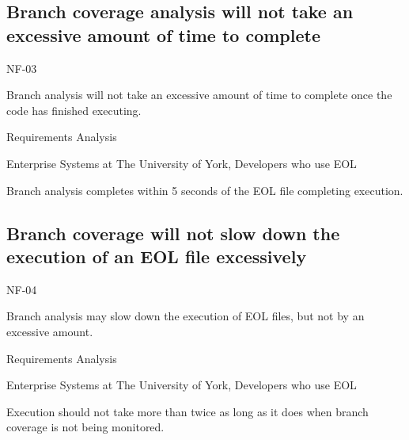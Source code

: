 \subsection{Branch coverage analysis will not take an excessive amount of time to complete}
\begin{description}[style=sameline,leftmargin=4.5cm,nolistsep]
\item[\hspace*{0.3cm}Label] NF-03
\item[\hspace*{0.3cm}Description] Branch analysis will not take an excessive amount of time to complete once the code has finished executing.
\item[\hspace*{0.3cm}Source] Requirements Analysis
\item[\hspace*{0.3cm}Stakeholders] Enterprise Systems at The University of York, Developers who use EOL
\item[\hspace*{0.3cm}Satisfiable Conditions] Branch analysis completes within 5 seconds of the EOL file completing execution.
\end{description}

\subsection{Branch coverage will not slow down the execution of an EOL file excessively}
\begin{description}[style=sameline,leftmargin=4.5cm,nolistsep]
\item[\hspace*{0.3cm}Label] NF-04
\item[\hspace*{0.3cm}Description] Branch analysis may slow down the execution of EOL files, but not by an excessive amount.
\item[\hspace*{0.3cm}Source] Requirements Analysis
\item[\hspace*{0.3cm}Stakeholders] Enterprise Systems at The University of York, Developers who use EOL
\item[\hspace*{0.3cm}Satisfiable Conditions] Execution should not take more than twice as long as it does when branch coverage is not being monitored.
\end{description}

